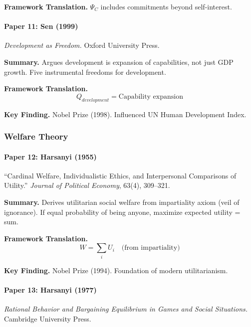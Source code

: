 \textbf{Framework Translation.}
$\Psi_C$ includes commitments beyond self-interest.

\paragraph{Paper 11: Sen (1999)}

\textit{Development as Freedom.}
Oxford University Press.

\textbf{Summary.}
Argues development is expansion of capabilities, not just GDP growth.
Five instrumental freedoms for development.

\textbf{Framework Translation.}
\begin{equation}
Q_{development} = \text{Capability expansion}
\end{equation}

\textbf{Key Finding.}
Nobel Prize (1998). Influenced UN Human Development Index.

\subsubsection{Welfare Theory}

\paragraph{Paper 12: Harsanyi (1955)}

``Cardinal Welfare, Individualistic Ethics, and Interpersonal Comparisons 
of Utility.''
\textit{Journal of Political Economy}, 63(4), 309--321.

\textbf{Summary.}
Derives utilitarian social welfare from impartiality axiom (veil of ignorance).
If equal probability of being anyone, maximize expected utility = sum.

\textbf{Framework Translation.}
\begin{equation}
W = \sum_i U_i \quad \text{(from impartiality)}
\end{equation}

\textbf{Key Finding.}
Nobel Prize (1994). Foundation of modern utilitarianism.

\paragraph{Paper 13: Harsanyi (1977)}

\textit{Rational Behavior and Bargaining Equilibrium in Games and Social Situations.}
Cambridge University Press.

